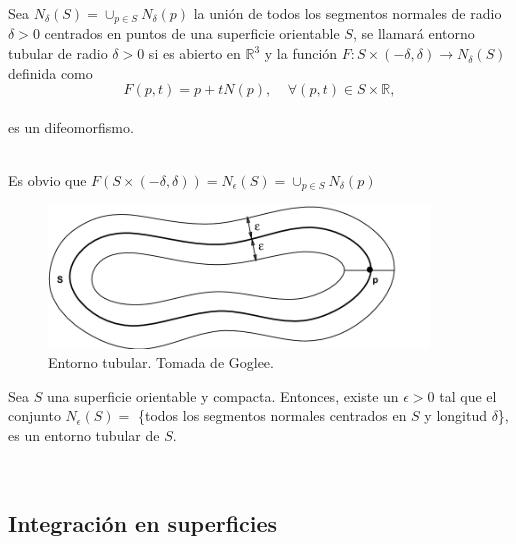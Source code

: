 \begin{definicion}
	Sea $N_{\delta}(S) = \cup_{p \in S} N_{\delta}(p)$ la unión de todos los segmentos normales de radio $\delta > 0$ centrados en puntos de una superficie orientable $S$, se llamará entorno tubular de radio $\delta > 0$ si es abierto en $\mathbb{R}^3$ y la función $F : S \times (-\delta, \delta) \to N_{\delta}(S)$ definida como
	${ }$\\
	$$ F(p,t) = p +tN(p), \;\;\;\; \forall (p,t) \in S \times \mathbb{R}, $$
	${ }$\\
	es un difeomorfismo.
\end{definicion}
${ }$\\

Es obvio que $F(S \times (-\delta, \delta)) = N_{\epsilon}(S) = \cup_{p \in S} N_{\delta}(p)$
${ }$\\

\begin{figure}[h]
	\begin{center}
		\includegraphics[width=0.9\textwidth]{imagenes/tubular.png}
	\end{center}
	\caption{Entorno tubular. Tomada de Goglee. }
	\label{fig:etiq_13}
\end{figure}

\begin{teorema}
	Sea $S$ una superficie orientable y compacta. Entonces, existe un $\epsilon > 0$ tal que el conjunto $N_{\epsilon}(S) =$ \{todos los segmentos normales centrados en $S$ y longitud $\delta$\}, es un entorno tubular de $S$.
	${ }$\\
	
\end{teorema}




${ }$\\
\subsection{Integración en superficies}
${ }$\\


